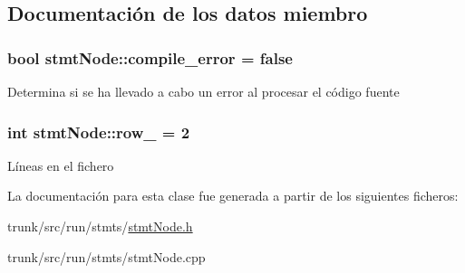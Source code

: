 \subsection{Documentación de los datos miembro}
\hypertarget{classstmtNode_aa1f2b53dbf57a8030442f44de541e6bc}{
\subsubsection[{compile\-\_\-error}]{\setlength{\rightskip}{0pt plus 5cm}bool stmt\-Node\-::compile\-\_\-error = false\hspace{0.3cm}{\ttfamily [static]}}}\label{classstmtNode_aa1f2b53dbf57a8030442f44de541e6bc}
Determina si se ha llevado a cabo un error al procesar el código fuente \hypertarget{classstmtNode_a5238bce92ef57e15abd5eacdd4c7cbae}{
\subsubsection[{row\-\_\-}]{\setlength{\rightskip}{0pt plus 5cm}int stmt\-Node\-::row\-\_\- = 2\hspace{0.3cm}{\ttfamily [static]}}}\label{classstmtNode_a5238bce92ef57e15abd5eacdd4c7cbae}
Líneas en el fichero 

La documentación para esta clase fue generada a partir de los siguientes ficheros\-:\begin{DoxyCompactItemize}
\item 
trunk/src/run/stmts/\hyperlink{stmtNode_8h}{stmt\-Node.\-h}\item 
trunk/src/run/stmts/stmt\-Node.\-cpp\end{DoxyCompactItemize}
